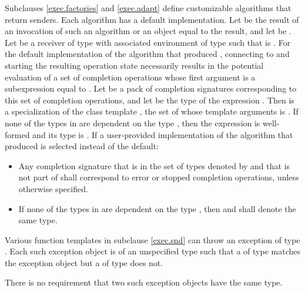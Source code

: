 \pnum
Subclauses \ref{exec.factories} and \ref{exec.adapt} define
customizable algorithms that return senders.
Each algorithm has a default implementation.
Let  be the result of an invocation of such an algorithm or
an object equal to the result, and
let  be .
Let  be a receiver of type 
with associated environment  of type 
such that  is .
For the default implementation of the algorithm that produced ,
connecting  to  and
starting the resulting operation state
necessarily results in the potential evaluation of
a set of completion operations
whose first argument is a subexpression equal to .
Let  be a pack of completion signatures corresponding to
this set of completion operations, and
let  be
the type of the expression .
Then  is
a specialization of
the class template ,
the set of whose template arguments is .
If none of the types in  are dependent on the type , then
the expression  is well-formed and
its type is .
If a user-provided implementation of the algorithm
that produced  is selected instead of the default:

\begin{itemize}
\item
Any completion signature
that is in the set of types
denoted by  and
that is not part of  shall correspond to
error or stopped completion operations,
unless otherwise specified.

\item
If none of the types in  are dependent on the type , then
 and
shall denote the same type.
\end{itemize}

\pnum
{}%
Various function templates in subclause \ref{exec.snd}
can throw an exception of type .
Each such exception object is of an unspecified type
such that a  of type 
matches the exception object
but a  of type  does not.
\begin{note}
There is no requirement that two such exception objects have the same type.
\end{note}

